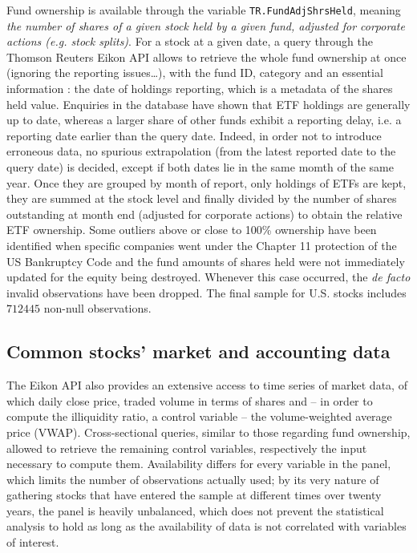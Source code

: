 Fund ownership is available through the variable \texttt{TR.FundAdjShrsHeld}, meaning \textit{the number of shares of a given stock held by a given fund, adjusted for corporate actions (e.g. stock splits)}. For a stock at a given date, a query through the Thomson Reuters Eikon API allows to retrieve the whole fund ownership at once (ignoring the reporting issues\dots), with the fund ID, category and an essential information : the date of holdings reporting, which is a metadata of the shares held value. Enquiries in the database have shown that ETF holdings are generally up to date, whereas a larger share of other funds exhibit a reporting delay, i.e. a reporting date earlier than the query date. Indeed, in order not to introduce erroneous data, no spurious extrapolation (from the latest reported date to the query date) is decided, except if both dates lie in the same momth of the same year. Once they are grouped by month of report, only holdings of ETFs are kept, they are summed at the stock level and finally divided by the number of shares outstanding at month end (adjusted for corporate actions) to obtain the relative ETF ownership. Some outliers above or close to 100\% ownership have been identified when specific companies went under the Chapter 11 protection of the US Bankruptcy Code and the fund amounts of shares held were not immediately updated for the equity being destroyed. Whenever this case occurred, the \textit{de facto} invalid observations have been dropped. The final sample for U.S. stocks includes $712445$ non-null observations.
\subsection{Common stocks' market and accounting data}
The Eikon API also provides an extensive access to time series of market data, of which daily close price, traded volume in terms of shares and -- in order to compute the \textcite{Amihud2002} illiquidity ratio, a control variable -- the volume-weighted average price (VWAP). Cross-sectional queries, similar to those regarding fund ownership, allowed to retrieve the remaining control variables, respectively the input necessary to compute them. Availability differs for every variable in the panel, which limits the number of observations actually used; by its very nature of gathering stocks that have entered the sample at different times over twenty years, the panel is heavily unbalanced, which does not prevent the statistical analysis to hold as long as the availability of data is not correlated with variables of interest.

